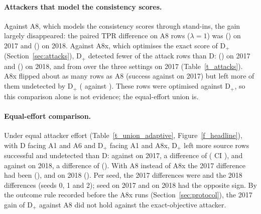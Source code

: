 \paragraph{Attackers that model the consistency scores.}
Against A8, which models the consistency scores through stand-ins, the gain largely disappeared: the paired TPR
difference on A8 rows ($\lambda = 1$) was \tprAeightOneVoneSeventeen{} (\tprAeightOneVoneSeventeenCI) on 2017 and
\tprAeightOneVoneEighteen{} (\tprAeightOneVoneEighteenCI) on 2018.
Against A8x, which optimises the exact score of D$_+$ (Section~\ref{sec:attacks}), D$_+$ detected fewer of the attack
rows than D: \xtprAxOneVoneSeventeen{} (\xtprAxOneVoneSeventeenCI) on 2017 and \xtprAxOneVoneEighteen{}
(\xtprAxOneVoneEighteenCI) on 2018, and from \xtprAxVoneRangeSeventeen{} over the three settings on 2017
(Table~\ref{t_attacks}).
A8x flipped about as many rows as A8 (success \xsuccAxOneVoneSeventeen{} against \xsuccAeightOneVoneSeventeen{} on 2017)
but left more of them undetected by D$_+$ (\xundetAxOneVoneSeventeen{} against \xundetAeightOneVoneSeventeen).
These rows were optimised against D$_+$, so this comparison alone is not evidence; the equal-effort union is.

\paragraph{Equal-effort comparison.}
Under equal attacker effort (Table~\ref{t_union_adaptive}, Figure~\ref{f_headline}), with D facing A1 and A6 and D$_+$
facing A1 and A8x, D$_+$ left more source rows successful and undetected than D: \axHeadVoneSeventeenDplus{} against
\axHeadVoneSeventeenD{} on 2017, a difference of \axHeadVoneSeventeen{} (\paramCILevel{} CI \axHeadVoneSeventeenCI),
and \axHeadVoneEighteenDplus{} against \axHeadVoneEighteenD{} on 2018, a difference of \axHeadVoneEighteen{}
(\axHeadVoneEighteenCI).
With A8 instead of A8x the 2017 difference had been \axStandinVoneSeventeen{} (\axStandinVoneSeventeenCI), and on 2018
\axStandinVoneEighteen{} (\axStandinVoneEighteenCI).
Per seed, the 2017 differences were \axHeadVoneSeventeenSeeds{} and the 2018 differences \axHeadVoneEighteenSeeds{}
(seeds 0, 1 and 2); \axHeadOppSeedsSeventeen{} seed on 2017 and \axHeadOppSeedsEighteen{} on 2018 had the opposite
sign.
By the outcome rule recorded before the A8x runs (Section~\ref{sec:protocol}), the 2017 gain of D$_+$ against A8 did
not hold against the exact-objective attacker.

